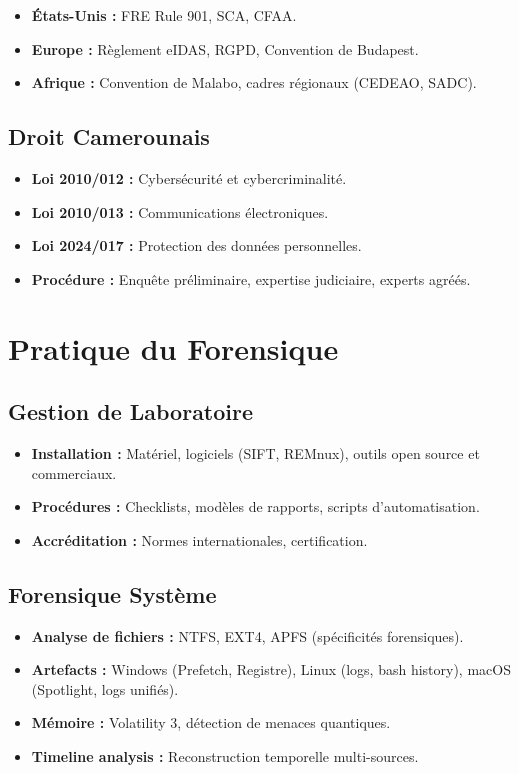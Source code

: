\documentclass[12pt]{article}
\begin{document}
\begin{itemize}
    \item \textbf{États-Unis :} FRE Rule 901, SCA, CFAA.
    \item \textbf{Europe :} Règlement eIDAS, RGPD, Convention de Budapest.
    \item \textbf{Afrique :} Convention de Malabo, cadres régionaux (CEDEAO, SADC).
\end{itemize}

\subsection{Droit Camerounais}

\begin{itemize}
    \item \textbf{Loi 2010/012 :} Cybersécurité et cybercriminalité.
    \item \textbf{Loi 2010/013 :} Communications électroniques.
    \item \textbf{Loi 2024/017 :} Protection des données personnelles.
    \item \textbf{Procédure :} Enquête préliminaire, expertise judiciaire, experts agréés.
\end{itemize}

\section{Pratique du Forensique}

\subsection{Gestion de Laboratoire}

\begin{itemize}
    \item \textbf{Installation :} Matériel, logiciels (SIFT, REMnux), outils open source et commerciaux.
    \item \textbf{Procédures :} Checklists, modèles de rapports, scripts d'automatisation.
    \item \textbf{Accréditation :} Normes internationales, certification.
\end{itemize}

\subsection{Forensique Système}

\begin{itemize}
    \item \textbf{Analyse de fichiers :} NTFS, EXT4, APFS (spécificités forensiques).
    \item \textbf{Artefacts :} Windows (Prefetch, Registre), Linux (logs, bash history), macOS (Spotlight, logs unifiés).
    \item \textbf{Mémoire :} Volatility 3, détection de menaces quantiques.
    \item \textbf{Timeline analysis :} Reconstruction temporelle multi-sources.
\end{itemize}
\end{document}
